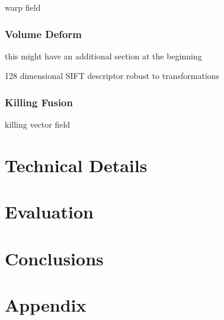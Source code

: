 \documentclass[a4paper]{article}
\begin{document}
warp field

\subsubsection{Volume Deform}

this might have an additional section at the beginning 

128 dimensional SIFT descriptor
robust to transformations

\subsubsection{Killing Fusion}

killing vector field

\section{Technical Details}

\section{Evaluation}

\section{Conclusions}

\section{Appendix}



\end{document}
